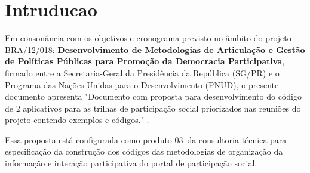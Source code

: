 \documentclass[12pt]{article}
\newcommand{\ProductNumber}{03}
\newcommand{\ProductDescription}{"Documento com proposta para desenvolvimento
        do código de 2 aplicativos para as trilhas de participação social
        priorizados nas reuniões do projeto contendo exemplos e códigos."
}
\begin{document}











%

\tableofcontents
\clearpage

\listoffigures
\clearpage

\begin{abstract}
The software architecture of a computer program represents the basic structure
and the externally visible relationships of those components. The documentation
of this architecture is of great importance to monitor and evaluate the
evolution of a system and to measure their attributes of modularity as coupling
and cohesion. A tool capable of extracting this documentation automatically
enables monitor and measure these attributes during the evolution of a software
project. This paper presents the implementation of a tool for automatic
extraction of information of dependence between modules for programs written in
C/C++ with focus on attributes of modularity to monitor the evolution of the
system. At the end of this paper is done an evaluation of this
tool through a case study.

{\bf Keywords:} software engineering, metrics, software architecture, coupling,
cohesion, C, C++, depedency.
\end{abstract}

\section{Intruducao}

Em consonância com os objetivos e cronograma previsto no âmbito do
projeto BRA/12/018:
\textbf{Desenvolvimento de Metodologias de Articulação e Gestão de
Políticas Públicas para Promoção da Democracia Participativa},
firmado entre a Secretaria-Geral da Presidência da República
(SG/PR) e o Programa das Nações Unidas para o Desenvolvimento (PNUD),
o presente documento apresenta \ProductDescription.

Essa proposta está configurada como produto \ProductNumber~da consultoria técnica
para especificação da construção dos códigos das metodologias de
organização da informação e interação participativa do portal de
participação social.
\end{document}
